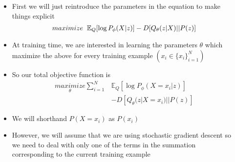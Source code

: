 \begin{frame}
	\begin{columns}
		\begin{overlayarea}{\textwidth}{\textheight}
		\vspace{1cm}
		
		\end{overlayarea}
		\begin{overlayarea}{\textwidth}{\textheight}
			\footnotesize{\begin{itemize}[<+->]\justifying
				\item First we will just reintroduce the parameters in the equation to make things explicit
				\begin{align*}
				maximize \hspace{0.2cm}\mathbb{E}_Q[\log P_\phi(X|z)] - D [Q_\theta(z|X) || P(z)]
				\end{align*}
				\item At training time, we are interested in learning  the parameters $\theta$ which maximize the above for every training example $(x_i \in \{x_i\}_{i=1}^N)$
				\item So our total objective function is
				\begin{align*}
				\underset{\theta}{maximize} \sum_{i=1}^N &\mathbb{E}_Q[\log P_\phi(X=x_i|z)] \\
				&- D [Q_\theta(z|X=x_i) || P(z)]
				\end{align*}
				\item We will shorthand $P(X=x_i)$ as $P(x_i)$
				\item However, we will assume that we are using stochastic gradient descent so we need to deal with only one of the terms in the summation corresponding to the current training example
			\end{itemize}}
		\end{overlayarea}
	\end{columns}
\end{frame}

